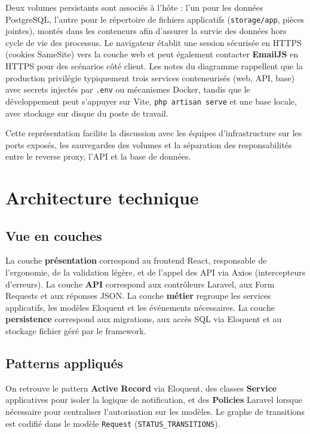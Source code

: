 Deux volumes persistants sont associés à l'hôte : l'un pour les données PostgreSQL, l'autre pour le répertoire de fichiers applicatifs (\texttt{storage/app}, pièces jointes), montés dans les conteneurs afin d'assurer la survie des données hors cycle de vie des processus. Le navigateur établit une session sécurisée en HTTPS (cookies SameSite) vers la couche web et peut également contacter \textbf{EmailJS} en HTTPS pour des scénarios côté client. Les notes du diagramme rappellent que la production privilégie typiquement trois services conteneurisés (web, API, base) avec secrets injectés par \texttt{.env} ou mécanismes Docker, tandis que le développement peut s'appuyer sur Vite, \texttt{php artisan serve} et une base locale, avec stockage sur disque du poste de travail.

Cette représentation facilite la discussion avec les équipes d'infrastructure sur les ports exposés, les sauvegardes des volumes et la séparation des responsabilités entre le reverse proxy, l'API et la base de données.

\vspace{0.5cm}

\newpage
\section{Architecture technique}

\subsection{Vue en couches}

La couche \textbf{présentation} correspond au frontend React, responsable de l'ergonomie, de la validation légère, et de l'appel des API via Axios (intercepteurs d'erreurs). La couche \textbf{API} correspond aux contrôleurs Laravel, aux Form Requests et aux réponses JSON. La couche \textbf{métier} regroupe les services applicatifs, les modèles Eloquent et les événements nécessaires. La couche \textbf{persistence} correspond aux migrations, aux accès SQL via Eloquent et au stockage fichier géré par le framework.

\subsection{Patterns appliqués}

On retrouve le pattern \textbf{Active Record} via Eloquent, des classes \textbf{Service} applicatives pour isoler la logique de notification, et des \textbf{Policies} Laravel lorsque nécessaire pour centraliser l'autorisation sur les modèles. Le graphe de transitions est codifié dans le modèle \texttt{Request} (\texttt{STATUS\_TRANSITIONS}).

